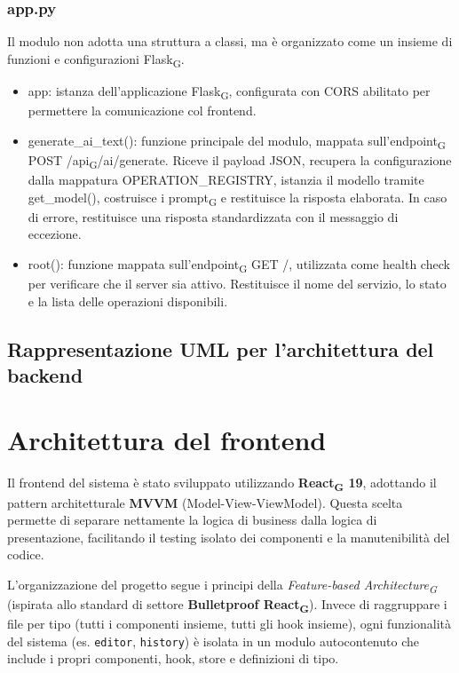 \documentclass[11pt,a4paper]{article}
\newcommand{\gls}[1]{#1\textsubscript{G}}
\begin{document}
\subsubsection{app.py}
Il modulo non adotta una struttura a classi, ma è organizzato come un insieme di funzioni e configurazioni \gls{Flask}.
\begin{itemize}
\item app: istanza dell'applicazione \gls{Flask}, configurata con CORS abilitato per permettere la comunicazione col frontend.
\item generate\_ai\_text(): funzione principale del modulo, mappata sull'\gls{endpoint} POST /\gls{api}/ai/generate. Riceve il payload JSON, recupera la configurazione dalla mappatura OPERATION\_REGISTRY, istanzia il modello tramite get\_model(), costruisce i \gls{prompt} e restituisce la risposta elaborata. In caso di errore, restituisce una risposta standardizzata con il messaggio di eccezione.
\item root(): funzione mappata sull'\gls{endpoint} GET /, utilizzata come health check per verificare che il server sia attivo. Restituisce il nome del servizio, lo stato e la lista delle operazioni disponibili.
\end{itemize}

\subsection{Rappresentazione UML per l'architettura del backend}

\newpage

\section{Architettura del frontend}
Il frontend del sistema è stato sviluppato utilizzando \textbf{\gls{React} 19}, adottando il pattern architetturale \textbf{MVVM} (Model-View-ViewModel). Questa scelta permette di separare nettamente la logica di business dalla logica di presentazione, facilitando il testing isolato dei componenti e la manutenibilità del codice.

L'organizzazione del progetto segue i principi della \textit{\gls{Feature-based Architecture}} (ispirata allo standard di settore \textbf{Bulletproof \gls{React}}). Invece di raggruppare i file per tipo (tutti i componenti insieme, tutti gli hook insieme), ogni funzionalità del sistema (es. \texttt{editor}, \texttt{history}) è isolata in un modulo autocontenuto che include i propri componenti, hook, store e definizioni di tipo.
\end{document}
